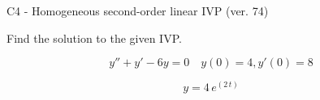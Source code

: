 \begin{exercise}
  \begin{exerciseTitle}C4 - Homogeneous second-order linear IVP (ver. 74)\end{exerciseTitle}
  \begin{exerciseStatement}
    
Find the solution to the given IVP.

    
\[y''+y'-6y = 0 \hspace{1em} y(0) = 4 , y'(0) = 8\]

  \end{exerciseStatement}
  \begin{exerciseAnswer}
    
\[y= 4 \, e^{\left(2 \, t\right)}\]

  \end{exerciseAnswer}
\end{exercise}